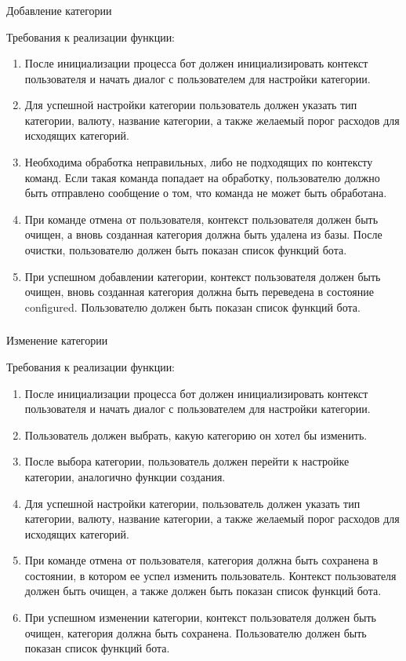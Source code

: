 \subsubsection{} Добавление категории
\label{sec:domain:specification:addcategory}

Требования к реализации функции:

\begin{enumerate}
	\item После инициализации процесса бот должен инициализировать контекст пользователя и начать диалог с пользователем для настройки категории.
	\item Для успешной настройки категории пользователь должен указать тип категории, валюту, название категории, а также желаемый порог расходов для исходящих категорий.
	\item Необходима обработка неправильных, либо не подходящих по контексту команд. Если такая команда попадает на обработку, пользователю должно быть отправлено сообщение о том, что команда не может быть обработана.
	\item При команде отмена от пользователя, контекст пользователя должен быть очищен, а вновь созданная категория должна быть удалена из базы. После очистки, пользователю должен быть показан список функций бота.
	\item При успешном добавлении категории, контекст пользователя должен быть очищен, вновь созданная категория должна быть переведена в состояние configured. Пользователю должен быть показан список функций бота.
\end{enumerate}

\subsubsection{} Изменение категории
\label{sec:domain:specification:editcategory}

Требования к реализации функции:

\begin{enumerate}
	\item После инициализации процесса бот должен инициализировать контекст пользователя и начать диалог с пользователем для настройки категории.
	\item Пользователь должен выбрать, какую категорию он хотел бы изменить.
	\item После выбора категории, пользователь должен перейти к настройке категории, аналогично функции создания.
	\item Для успешной настройки категории, пользователь должен указать тип категории, валюту, название категории, а также желаемый порог расходов для исходящих категорий.
	\item При команде отмена от пользователя, категория должна быть сохранена в состоянии, в котором ее успел изменить пользователь. Контекст пользователя должен быть очищен, а также должен быть показан список функций бота.
	\item При успешном изменении категории, контекст пользователя должен быть очищен, категория должна быть сохранена. Пользователю должен быть показан список функций бота.
\end{enumerate}

